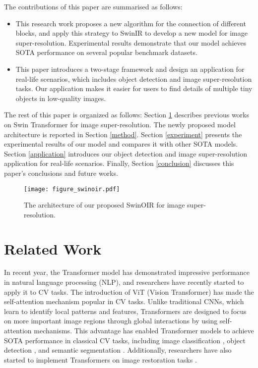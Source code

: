 \documentclass[default,iicol]{sn-jnl}
\theoremstyle{thmstyleone}\newtheorem{theorem}{Theorem}\newtheorem{proposition}[theorem]{Proposition}
\theoremstyle{thmstyletwo}\newtheorem{example}{Example}\newtheorem{remark}{Remark}\theoremstyle{thmstylethree}\newtheorem{definition}{Definition}
\begin{document}
The contributions of this paper are summarised as follows:
\begin{itemize}
\item [1)]
This research work proposes a new algorithm for the connection of different blocks, and apply this strategy to SwinIR to develop a new model for image super-resolution. Experimental results demonstrate that our model achieves SOTA performance on several popular benchmark datasets.
\end{itemize}
\begin{itemize}
\item [2)]
This paper introduces a two-stage framework and design an application for real-life scenarios, which includes object detection and image super-resolution tasks. Our application makes it easier for users to find details of multiple tiny objects in low-quality images.
\end{itemize}

The rest of this paper is organized as follows: Section \ref{related} describes previous works on Swin Transformer for image super-resolution. The newly proposed model architecture is reported in Section \ref{method}. Section \ref{experiment} presents the experimental results of our model and compares it with other SOTA models. Section \ref{application} introduces our object detection and image super-resolution application for real-life scenarios. Finally, Section \ref{conclusion} discusses this paper's conclusions and future works.

\begin{figure*}[h]
  \centering
  \texttt{[image: figure\_swinoir.pdf]}
  \caption{The architecture of our proposed SwinOIR for image super-resolution.}
  \label{fig_swinoir}
\end{figure*}

\section{Related Work}
\label{related}
In recent year, the Transformer model \cite{vaswani2017attention} has demonstrated impressive performance in natural language processing (NLP), and researchers have recently started to apply it to CV tasks. The introduction of ViT (Vision Transformer) \cite{dosovitskiy2020image} has made the self-attention mechanism popular in CV tasks. Unlike traditional CNNs, which learn to identify local patterns and features, Transformers are designed to focus on more important image regions through global interactions by using self-attention mechanisms. This advantage has enabled Transformer models to achieve SOTA performance in classical CV tasks, including image classification \cite{wu2020visual}\cite{vaswani2021scaling}, object detection \cite{carion2020end}\cite{liu2020deep}, and semantic segmentation \cite{cao2021swin}\cite{zheng2021rethinking}. Additionally, researchers have also started to implement Transformers on image restoration tasks \cite{chen2021pre}\cite{wang2022uformer}.
\end{document}
